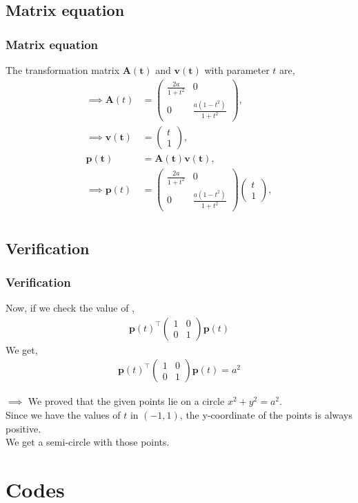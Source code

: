 \documentclass{beamer}
\theoremstyle{remark}
\newcommand{\myvec}[1]{\ensuremath{\begin{pmatrix}#1\end{pmatrix}}}
\let\vec\mathbf
\numberwithin{equation}{section}
\begin{document}
\subsection{Matrix equation}
\begin{frame}
\frametitle{Matrix equation}
	The transformation matrix $\vec{A(t)}$ and $\vec{v(t)}$ with parameter $t$ are,\\
	\begin{align}
		\implies \mathbf{A}(t) & = \myvec{ \frac{2a}{1+t^2} & 0 \\ 0 & \frac{a(1-t^2)}{1+t^2}},\\ \implies \mathbf{v(t)} &= \myvec{t \\ 1},\\ \mathbf{p(t)} &= \mathbf{A(t)} \mathbf{v(t)}, \\\implies  \mathbf{p}(t) & = \myvec{ \frac{2a}{1+t^2} & 0 \\ 0 & \frac{a(1 - t^2)}{1+t^2} } \myvec{t \\ 1},\\ 
	\end{align}
\end{frame}
\subsection{Verification}
\begin{frame}[fragile]
\frametitle{Verification}
Now, if we check the value of ,
    \begin{align}
    \mathbf{p}(t)^\top \myvec{ 1 & 0 \\ 0 & 1 } \mathbf{p}(t)
    \end{align}
	We get,\\
  \begin{align}
    \mathbf{p}(t)^\top \myvec{ 1 & 0 \\ 0 & 1 } \mathbf{p}(t)=a^2
    \end{align}

	$\implies$ We proved that the given points lie on a circle $x^2 + y^2 = a^2$.\\
	Since we have the values of $t$ in $(-1,1)$, the y-coordinate of the points is always positive.\\
	We get a semi-circle with those points.
\end{frame}

\section{Codes}
\end{document}
